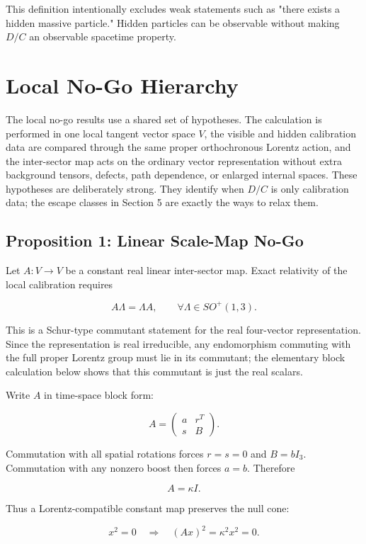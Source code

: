 \documentclass[11pt]{article}
\begin{document}
This definition intentionally excludes weak statements such as "there exists a hidden massive particle." Hidden particles can be observable without making \(D/C\) an observable spacetime property.


\section{Local No-Go Hierarchy}


The local no-go results use a shared set of hypotheses. The calculation is performed in one local tangent vector space \(V\), the visible and hidden calibration data are compared through the same proper orthochronous Lorentz action, and the inter-sector map acts on the ordinary vector representation without extra background tensors, defects, path dependence, or enlarged internal spaces. These hypotheses are deliberately strong. They identify when \(D/C\) is only calibration data; the escape classes in Section 5 are exactly the ways to relax them.


\subsection{Proposition 1: Linear Scale-Map No-Go}


Let \(A:V\to V\) be a constant real linear inter-sector map. Exact relativity of the local calibration requires


\[
A\Lambda=\Lambda A,\qquad \forall \Lambda\in SO^+(1,3).
\]


This is a Schur-type commutant statement for the real four-vector representation. Since the representation is real irreducible, any endomorphism commuting with the full proper Lorentz group must lie in its commutant; the elementary block calculation below shows that this commutant is just the real scalars.


Write \(A\) in time-space block form:


\[
A=
\begin{pmatrix}
a&r^T\\
s&B
\end{pmatrix}.
\]


Commutation with all spatial rotations forces \(r=s=0\) and \(B=bI_3\). Commutation with any nonzero boost then forces \(a=b\). Therefore


\[
A=\kappa I .
\]


Thus a Lorentz-compatible constant map preserves the null cone:


\[
x^2=0 \quad\Rightarrow\quad (Ax)^2=\kappa^2x^2=0 .
\]
\end{document}
